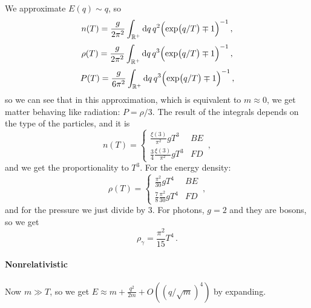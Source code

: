 \documentclass[main.tex]{subfiles}
\begin{document}
We approximate \(E(q) \sim q\), so  
%
\begin{equation}
  n(T) = \frac{g}{2 \pi^2} \int _{\mathbb{R}^{+}} \dd{q} q^2 \qty(\exp(q/T) \mp 1 )^{-1} 
\,,
\end{equation}
%
%
\begin{equation}
    \rho (T) = \frac{g}{2 \pi^2} \int _{\mathbb{R}^{+}} \dd{q} q^3 \qty(\exp(q/T) \mp 1 )^{-1} 
  \,,
\end{equation}
%
\begin{equation}
    P (T) = \frac{g}{6 \pi^2} \int _{\mathbb{R}^{+}} \dd{q} q^3 \qty(\exp(q/T) \mp 1 )^{-1} 
\,,
\end{equation}
%
so we can see that in this approximation, which is equivalent to \(m \approx 0\), we get matter behaving like radiation: \(P = \rho /3\).  
The result of the integrals depends on the type of the particles, and it is 
%
\begin{equation}
  n(T) = \begin{cases}
      \frac{\xi (3)}{\pi^2} g T^3 & BE  \\
      \frac{3}{4}\frac{\xi (3)}{\pi^2} g T^3 & FD  
  \end{cases}
\,,
\end{equation}
%
and we get the proportionality to \(T^3\).
For the energy density:
\begin{equation}
    \rho (T) = \begin{cases}
        \frac{\pi^2}{30} g T^4 & BE  \\
        \frac{7}{8}\frac{\pi^2}{30} g T^4 & FD  
    \end{cases}
  \,,
\end{equation}
and for the pressure we just divide by 3.
For photons, \(g=2\) and they are bosons, so we get 
%
\begin{equation}
  \rho _\gamma  = \frac{\pi^2}{15} T^{4}
\,.
\end{equation}

\paragraph{Nonrelativistic}

Now \(m \gg T\), so we get \(E \approx m + \frac{q^2}{2m} + O((q/\sqrt{m})^{4})\) by expanding.
\end{document}
